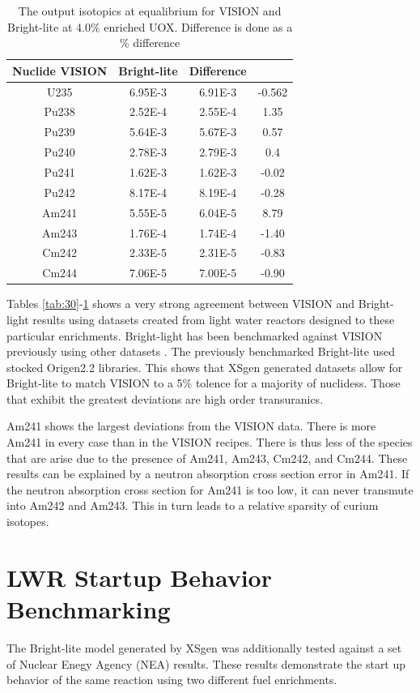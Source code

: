\documentclass{article}
\begin{document}
\begin{table}[!htb]
\centering
\small
\caption{The output isotopics at equalibrium for VISION and Bright-lite at 4.0\% enriched UOX. Difference is done as a \% difference}
\label{tab:40}
\vspace{0.5em}
\begin{tabular}{cccc}
Nuclide  VISION & Bright-lite & Difference \\
\hline
U235 & 6.95E-3 & 6.91E-3 & -0.562\\
Pu238 & 2.52E-4 & 2.55E-4 & 1.35\\
Pu239 & 5.64E-3 & 5.67E-3 & 0.57\\
Pu240 & 2.78E-3 & 2.79E-3 & 0.4\\
Pu241 & 1.62E-3  & 1.62E-3 & -0.02\\
Pu242 & 8.17E-4  & 8.19E-4 & -0.28\\
Am241 & 5.55E-5 & 6.04E-5 & 8.79\\
Am243 & 1.76E-4 & 1.74E-4 & -1.40\\
Cm242 & 2.33E-5 & 2.31E-5 & -0.83\\
Cm244 & 7.06E-5 & 7.00E-5 & -0.90\\
\hline
\end{tabular}
\end{table}

 Tables \ref{tab:30}-\ref{tab:40} shows a very strong agreement between VISION and Bright-light
results using datasets created from light water reactors designed to these particular
enrichments. Bright-light has been benchmarked against VISION previously using other datasets
\cite{brightlite}. The previously benchmarked Bright-lite used stocked Origen2.2\cite{origen2} libraries. This shows that
XSgen generated datasets allow for Bright-lite to match VISION to a 5\% tolence for a
majority of nuclidess. Those that exhibit the greatest deviations are high order transuranics.

Am241 shows the largest deviations from the VISION data. There is more Am241 in every
case than in the VISION recipes. There is thus less of the species that are arise due to
the presence of Am241, Am243, Cm242, and Cm244. These results can be explained by a
neutron absorption cross section error in Am241. If the neutron absorption cross section for
Am241 is too low, it can never transmute into Am242 and Am243. This in turn leads to a
relative sparsity of curium isotopes.

\section{LWR Startup Behavior Benchmarking}
The Bright-lite model generated by XSgen was additionally tested against a set of
Nuclear Enegy Agency (NEA) results\cite{nea}. These results demonstrate the start up behavior
of the same reaction using two different fuel enrichments.
\end{document}
